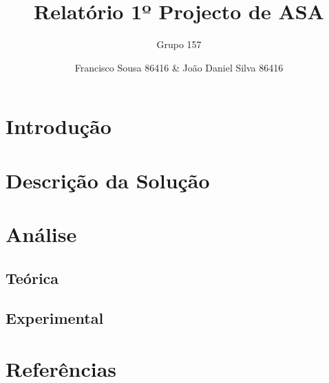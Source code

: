 \documentclass[12pt,a4paper]{article}
\author{Grupo 157 \and Francisco Sousa 86416 \& João Daniel Silva 86416}
\title{Relatório 1º Projecto de ASA}
\begin{document}
\maketitle

\section{Introdução}
\section{Descrição da Solução}
\section{Análise}
\subsection{Teórica}
\subsection{Experimental}
\section{Referências}
\end{document}
